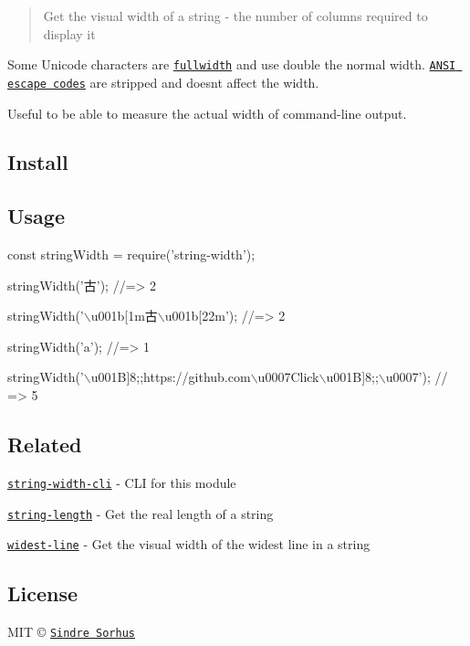 \begin{quote}
Get the visual width of a string -\/ the number of columns required to display it \end{quote}


Some Unicode characters are \href{https://en.wikipedia.org/wiki/Halfwidth_and_fullwidth_forms}{\tt fullwidth} and use double the normal width. \href{https://en.wikipedia.org/wiki/ANSI_escape_code}{\tt A\+N\+SI escape codes} are stripped and doesn\textquotesingle{}t affect the width.

Useful to be able to measure the actual width of command-\/line output.

\subsection*{Install}




\subsection*{Usage}


\begin{DoxyCode}
const stringWidth = require('string-width');

stringWidth('古');
//=> 2

stringWidth('\(\backslash\)u001b[1m古\(\backslash\)u001b[22m');
//=> 2

stringWidth('a');
//=> 1

stringWidth('\(\backslash\)u001B]8;;https://github.com\(\backslash\)u0007Click\(\backslash\)u001B]8;;\(\backslash\)u0007');
// => 5
\end{DoxyCode}


\subsection*{Related}


\begin{DoxyItemize}
\item \href{https://github.com/sindresorhus/string-width-cli}{\tt string-\/width-\/cli} -\/ C\+LI for this module
\item \href{https://github.com/sindresorhus/string-length}{\tt string-\/length} -\/ Get the real length of a string
\item \href{https://github.com/sindresorhus/widest-line}{\tt widest-\/line} -\/ Get the visual width of the widest line in a string
\end{DoxyItemize}

\subsection*{License}

M\+IT © \href{https://sindresorhus.com}{\tt Sindre Sorhus} 